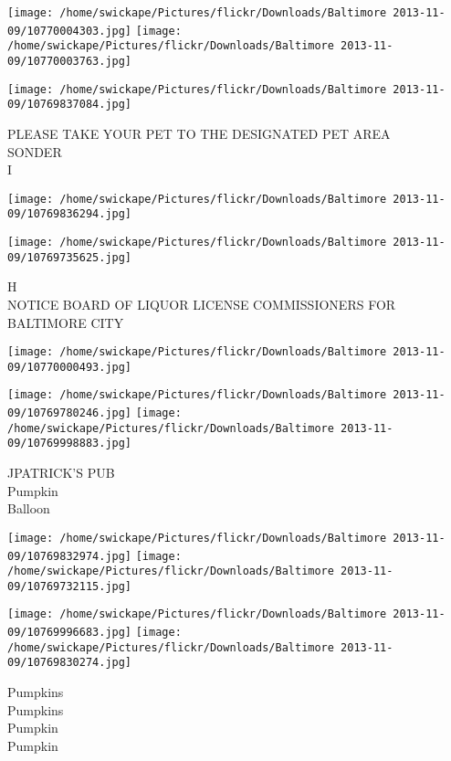 \documentclass[10pt,letterpaper]{article}
\begin{document}
\texttt{[image: /home/swickape/Pictures/flickr/Downloads/Baltimore 2013-11-09/10770004303.jpg]}
\texttt{[image: /home/swickape/Pictures/flickr/Downloads/Baltimore 2013-11-09/10770003763.jpg]}

\vspace{0.25in}
\texttt{[image: /home/swickape/Pictures/flickr/Downloads/Baltimore 2013-11-09/10769837084.jpg]}

PLEASE TAKE YOUR PET TO THE DESIGNATED PET AREA\\
SONDER\\
I\\
\pagebreak

\texttt{[image: /home/swickape/Pictures/flickr/Downloads/Baltimore 2013-11-09/10769836294.jpg]}

\vspace{0.25in}
\texttt{[image: /home/swickape/Pictures/flickr/Downloads/Baltimore 2013-11-09/10769735625.jpg]}

H\\
NOTICE BOARD OF LIQUOR LICENSE COMMISSIONERS FOR BALTIMORE CITY\\
\pagebreak

\texttt{[image: /home/swickape/Pictures/flickr/Downloads/Baltimore 2013-11-09/10770000493.jpg]}

\vspace{0.25in}
\texttt{[image: /home/swickape/Pictures/flickr/Downloads/Baltimore 2013-11-09/10769780246.jpg]}
\texttt{[image: /home/swickape/Pictures/flickr/Downloads/Baltimore 2013-11-09/10769998883.jpg]}

JPATRICK'S PUB\\
Pumpkin\\
Balloon\\
\pagebreak

\texttt{[image: /home/swickape/Pictures/flickr/Downloads/Baltimore 2013-11-09/10769832974.jpg]}
\texttt{[image: /home/swickape/Pictures/flickr/Downloads/Baltimore 2013-11-09/10769732115.jpg]}

\texttt{[image: /home/swickape/Pictures/flickr/Downloads/Baltimore 2013-11-09/10769996683.jpg]}
\texttt{[image: /home/swickape/Pictures/flickr/Downloads/Baltimore 2013-11-09/10769830274.jpg]}

Pumpkins\\
Pumpkins\\
Pumpkin\\
Pumpkin\\
\pagebreak
\end{document}
